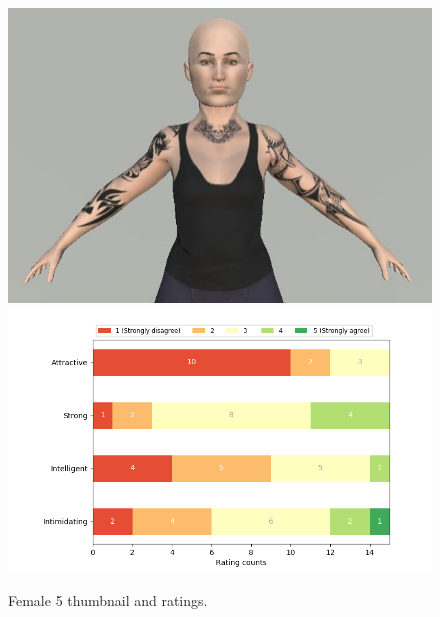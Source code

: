 \begin{figure}[H]
  \includegraphics[width=\linewidth]{Images/Females/5.JPG}
\endminipage\hfill
{}
  \includegraphics[width=\linewidth]{Survey/FRatings/avatar_f5.png}
\endminipage\hfill
\caption{Female 5 thumbnail and ratings.}
\end{figure}

